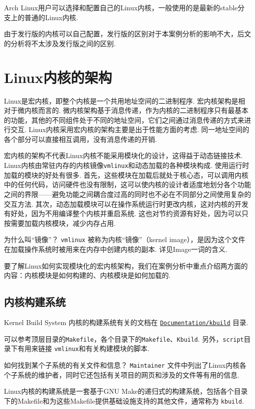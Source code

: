 \documentclass[11pt]{article}
\begin{document}
Arch Linux用户可以选择和配置自己的Linux内核，一般使用的是最新的stable分支上的普通的Linux内核.
\begin{notebox}
	由于发行版的内核可以自己配置，发行版的区别对于本案例分析的影响不大，后文的分析将不太涉及发行版之间的区别.
\end{notebox}
\section{Linux内核的架构}
Linux是宏内核，即整个内核是一个共用地址空间的二进制程序.
宏内核架构是相对于微内核而言的.
微内核架构基于消息传递，作为内核的二进制程序只有最基本的功能，其他的不同组件处于不同的地址空间，它们之间通过消息传递的方式来进行交互.
Linux内核采用宏内核的架构主要是出于性能方面的考虑.\cite{silberschatz2021operating}
同一地址空间的各个部分可以直接相互调用，没有消息传递的开销.

宏内核的架构不代表Linux内核不能采用模块化的设计，这得益于动态链接技术.
Linux内核由常驻内存的内核镜像\lstinline{vmlinux}和动态加载的各种模块构成.
使用运行时加载的模块的好处有很多.
首先，这些模块在加载后就处于核心态，可以调用内核中的任何代码，访问硬件也没有限制，这可以使内核的设计者适度地划分各个功能之间的界限——避免功能之间耦合度过高的同时也不必在不同部分之间使用复杂的交互方法.
其次，动态加载模块可以在操作系统运行时更改内核，这对内核的开发有好处，因为不用编译整个内核并重启系统.
这也对节约资源有好处，因为可以只按需要加载内核模块，减少内存占用.

\begin{qbox}{为什么叫“镜像”？}
	\lstinline{vmlinux} 被称为内核“镜像”（kernel image），是因为这个文件在加载操作系统时被用来在内存中创建内核的副本.
	详见Image一词的含义\cite{imageWik70:online}.
\end{qbox}

要了解Linux如何实现模块化的宏内核架构，我们在案例分析中重点介绍两方面的内容：内核模块是如何构建的、内核模块是如何加载的.

\subsection{内核构建系统}
\begin{readsrcbox}{Kernel Build System}
	内核的构建系统有关的文档在 \href{https://docs.kernel.org/kbuild/index.html}{\lstinline{Documentation/kbuild}} 目录.

	可以参考顶层目录的\lstinline{Makefile}，各个目录下的\lstinline{Makefile}、\lstinline{Kbuild}.
	另外，\lstinline{script}目录下有用来链接 \lstinline{vmlinux}和有关构建模块的脚本.
\end{readsrcbox}
\begin{qbox}{如何找到某个子系统的有关文件和信息？}
	\lstinline{Maintainer} 文件中列出了Linux内核各个子系统的维护者，同时它还包括有关项目的网页和涉及的文件等有用的信息.
\end{qbox}
Linux内核的构建系统是一套基于GNU Make的递归式的构建系统，包括各个目录下的Makefile和为这些Makefile提供基础设施支持的其他文件，通常称为 \lstinline{kbuild}. \cite{LinuxKer71:online}
\end{document}
